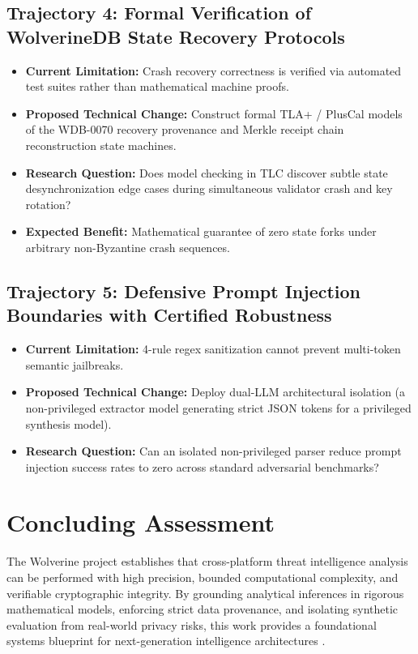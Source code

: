 \subsection{Trajectory 4: Formal Verification of WolverineDB State Recovery Protocols}
\begin{itemize}[noitemsep]
    \item \textbf{Current Limitation:} Crash recovery correctness is verified via automated test suites rather than mathematical machine proofs.
    \item \textbf{Proposed Technical Change:} Construct formal TLA+ / PlusCal models of the WDB-0070 recovery provenance and Merkle receipt chain reconstruction state machines.
    \item \textbf{Research Question:} Does model checking in TLC discover subtle state desynchronization edge cases during simultaneous validator crash and key rotation?
    \item \textbf{Expected Benefit:} Mathematical guarantee of zero state forks under arbitrary non-Byzantine crash sequences.
\end{itemize}

\subsection{Trajectory 5: Defensive Prompt Injection Boundaries with Certified Robustness}
\begin{itemize}[noitemsep]
    \item \textbf{Current Limitation:} 4-rule regex sanitization cannot prevent multi-token semantic jailbreaks.
    \item \textbf{Proposed Technical Change:} Deploy dual-LLM architectural isolation (a non-privileged extractor model generating strict JSON tokens for a privileged synthesis model).
    \item \textbf{Research Question:} Can an isolated non-privileged parser reduce prompt injection success rates to zero across standard adversarial benchmarks?
\end{itemize}

\section{Concluding Assessment}
\label{sec:concluding_assessment}

The Wolverine project establishes that cross-platform threat intelligence analysis can be performed with high precision, bounded computational complexity, and verifiable cryptographic integrity. By grounding analytical inferences in rigorous mathematical models, enforcing strict data provenance, and isolating synthetic evaluation from real-world privacy risks, this work provides a foundational systems blueprint for next-generation intelligence architectures \cite{nowok2016synthpop, castro2002practical, kleppmann2017designing}.
